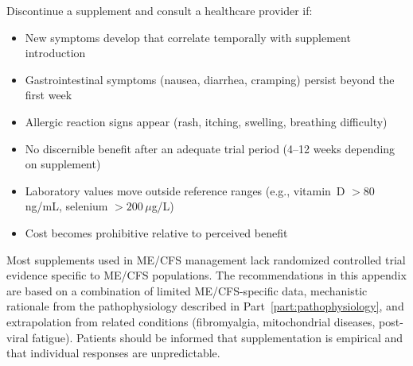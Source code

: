 Discontinue a supplement and consult a healthcare provider if:

\begin{itemize}
    \item New symptoms develop that correlate temporally with supplement introduction
    \item Gastrointestinal symptoms (nausea, diarrhea, cramping) persist beyond the first week
    \item Allergic reaction signs appear (rash, itching, swelling, breathing difficulty)
    \item No discernible benefit after an adequate trial period (4--12 weeks depending on supplement)
    \item Laboratory values move outside reference ranges (e.g., vitamin~D $>80$\,ng/mL, selenium $>200$\,$\mu$g/L)
    \item Cost becomes prohibitive relative to perceived benefit
\end{itemize}

\begin{limitation}
Most supplements used in ME/CFS management lack randomized controlled trial evidence specific to ME/CFS populations. The recommendations in this appendix are based on a combination of limited ME/CFS-specific data, mechanistic rationale from the pathophysiology described in Part~\ref{part:pathophysiology}, and extrapolation from related conditions (fibromyalgia, mitochondrial diseases, post-viral fatigue). Patients should be informed that supplementation is empirical and that individual responses are unpredictable.
\end{limitation}

